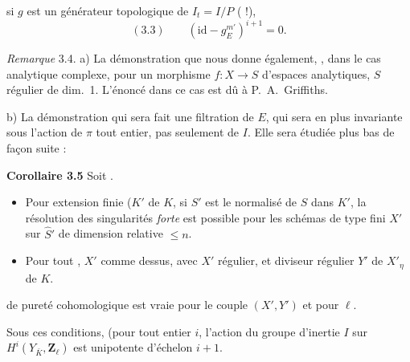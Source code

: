 \documentclass[11pt,a4paper]{article}
\begin{document}

si $g$ est un générateur topologique de $I_t = I/P$ ( !), 
\[
(3.3) \qquad (\mathrm{id} - g_E^{m'})^{i+1} = 0 .
\]

\emph{Remarque} 3.4. a) La démonstration que nous   donne \add{\ill{}} également, , dans le cas analytique complexe, pour un morphisme $f : X \to S$ d'espaces analytiques, $S$ régulier  de dim.~1. L'énoncé dans ce cas est dû à P.~A.~Griffiths.

b) La démonstration qui sera \struck{\ill{}}   fait une filtration \emph{} de $E$, qui sera en plus invariante sous l'action de $\pi$ tout entier, pas seulement de $I$. Elle sera étudiée plus bas de façon  \ill{} \ill{} \ill{} \ill{} suite :

\textbf{Corollaire 3.5} \struck{\ill{}} Soit     \struck{\ill{}}   \struck{\ill{}}.
\begin{itemize}
\item[(i)] Pour  extension finie ($K'$ de $K$, si $S'$ est le normalisé de $S$ dans $K'$, la résolution des singularités \emph{forte} est possible pour les schémas de type fini $X'$ sur $\hat S'$ de dimension relative $\leq n$.
\item[(ii)] Pour tout  \ill{}, $X'$ comme dessus, avec $X'$ régulier, et \uncertain{\ill{}} diviseur régulier $Y'$ de $X'_\eta$ de $K$.
\end{itemize}


de pureté cohomologique est vraie pour le couple $(X', Y')$ et pour $\ell$.

 Sous ces conditions, (pour tout entier $i$, l'action du groupe d'inertie $I$ sur \struck{\ill{}} $H^i(Y_{\bar K}, \mathbf{Z}_\ell)$ est  \add{\ill{}} unipotente d'échelon $i + 1$.
\end{document}
